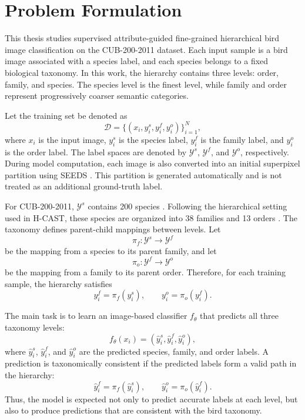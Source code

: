 \section{Problem Formulation}

This thesis studies supervised attribute-guided fine-grained hierarchical bird image classification on the CUB-200-2011 dataset. Each input sample is a bird image associated with a species label, and each species belongs to a fixed biological taxonomy. In this work, the hierarchy contains three levels: order, family, and species. The species level is the finest level, while family and order represent progressively coarser semantic categories.

Let the training set be denoted as
\begin{equation}
    \mathcal{D} = \{(x_i, y_i^{s}, y_i^{f}, y_i^{o})\}_{i=1}^{N},
\end{equation}
where \(x_i\) is the input image, \(y_i^{s}\) is the species label, \(y_i^{f}\) is the family label, and \(y_i^{o}\) is the order label. The label spaces are denoted by \(\mathcal{Y}^{s}\), \(\mathcal{Y}^{f}\), and \(\mathcal{Y}^{o}\), respectively. During model computation, each image is also converted into an initial superpixel partition using SEEDS \cite{van2015seeds}. This partition is generated automatically and is not treated as an additional ground-truth label.

For CUB-200-2011, \(\mathcal{Y}^{s}\) contains 200 species \cite{wah2011cub}. Following the hierarchical setting used in H-CAST, these species are organized into 38 families and 13 orders \cite{park2025visually}. The taxonomy defines parent-child mappings between levels. Let
\begin{equation}
    \pi_f : \mathcal{Y}^{s} \rightarrow \mathcal{Y}^{f}
\end{equation}
be the mapping from a species to its parent family, and let
\begin{equation}
    \pi_o : \mathcal{Y}^{f} \rightarrow \mathcal{Y}^{o}
\end{equation}
be the mapping from a family to its parent order. Therefore, for each training sample, the hierarchy satisfies
\begin{equation}
    y_i^{f} = \pi_f(y_i^{s}), 
    \qquad
    y_i^{o} = \pi_o(y_i^{f}).
\end{equation}

The main task is to learn an image-based classifier \(f_{\theta}\) that predicts all three taxonomy levels:
\begin{equation}
    f_{\theta}(x_i)
    =
    (\hat{y}_i^{s}, \hat{y}_i^{f}, \hat{y}_i^{o}),
\end{equation}
where \(\hat{y}_i^{s}\), \(\hat{y}_i^{f}\), and \(\hat{y}_i^{o}\) are the predicted species, family, and order labels. A prediction is taxonomically consistent if the predicted labels form a valid path in the hierarchy:
\begin{equation}
    \hat{y}_i^{f} = \pi_f(\hat{y}_i^{s}),
    \qquad
    \hat{y}_i^{o} = \pi_o(\hat{y}_i^{f}).
\end{equation}
Thus, the model is expected not only to predict accurate labels at each level, but also to produce predictions that are consistent with the bird taxonomy.

